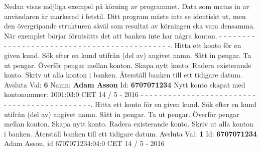 Nedan visas möjliga exempel på körning av programmet. Data som matas in av användaren är markerad i fetstil.
Ditt program måste inte se identiskt ut, men den övergripande strukturen såväl som resultat av körningen ska vara densamma.
När exemplet börjar förutsätts det att banken inte har några konton.
\newline
- - - - - - - - - - - - - - - - - - - - - - - - - - - - - - - - - - - - - - - - - - - -.   Hitta ett konto för en given kund.   Sök efter en kund utifrån (del av) angivet namn.   Sätt in pengar.   Ta ut pengar.   Överför pengar mellan konton.   Skapa nytt konto.   Radera existerande konto.   Skriv ut alla konton i banken.   Återställ banken till ett tidigare datum. Avsluta\newline
Val: \textbf{6}\newline
Namn: \textbf{Adam Asson}\newline
Id: \textbf{6707071234}\newline
Nytt konto skapat med kontonummer: 1001:03:0 CET 14 / 5 - 2016\newline
\newline
- - - - - - - - - - - - - - - - - - - - - - - - - - - - - - - - - - - - - - - - - - - -.   Hitta ett konto för en given kund.   Sök efter en kund utifrån (del av) angivet namn.   Sätt in pengar.   Ta ut pengar.   Överför pengar mellan konton.   Skapa nytt konto.   Radera existerande konto.   Skriv ut alla konton i banken.   Återställ banken till ett tidigare datum. Avsluta\newline
Val: \textbf{1}\newline
Id: \textbf{6707071234}\newline
Adam Asson, id 6707071234:04:0 CET 14 / 5 - 2016\newline
\newline

